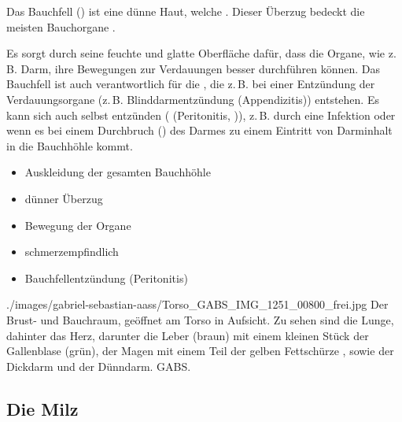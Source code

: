 {}
{%
Das Bauchfell () ist eine dünne Haut, welche . Dieser Überzug bedeckt die meisten
Bauchorgane .

Es sorgt durch seine feuchte und
glatte Oberfläche dafür, dass die Organe, wie z.\,B. Darm, ihre Bewegungen zur Verdauungen besser durchführen können.
Das Bauchfell ist auch verantwortlich für die , die z.\,B. bei
einer Entzündung der Verdauungsorgane (z.\,B. Blinddarmentzündung
(Appendizitis)) entstehen. Es kann sich auch selbst entzünden
( (Peritonitis, )),
z.\,B. durch eine Infektion oder wenn es bei einem Durchbruch
() des Darmes zu einem Eintritt von Darminhalt in die Bauchhöhle
kommt. 
}{
\begin{itemize}
    \item Auskleidung der gesamten Bauchhöhle
    \item dünner Überzug
    \item Bewegung der Organe
    \item schmerzempfindlich
    \item Bauchfellentzündung (Peritonitis)
\end{itemize}
}
{./images/gabriel-sebastian-aass/Torso_GABS_IMG_1251_00800_frei.jpg}
{Der Brust- und Bauchraum, geöffnet am Torso in
Aufsicht. Zu sehen sind die Lunge, dahinter das Herz, darunter die
Leber (braun) mit einem kleinen Stück der Gallenblase (grün), der Magen mit
einem Teil der gelben Fettschürze , sowie der Dickdarm und
der Dünndarm. } 
{GABS.}


{}

\subsection{Die Milz} 

